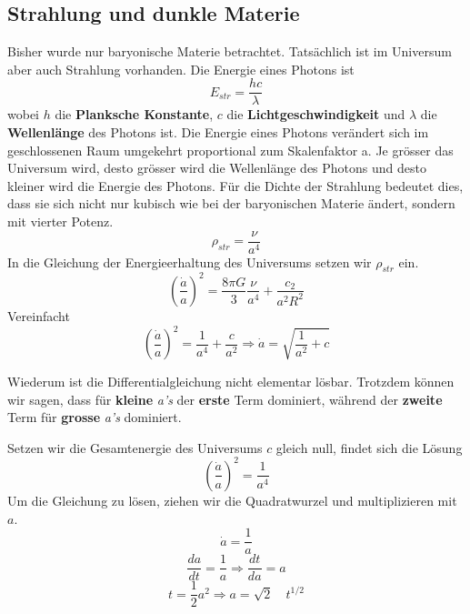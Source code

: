 \begin{refsection}
\subsection{Strahlung und dunkle Materie}
Bisher wurde nur baryonische Materie betrachtet. Tatsächlich ist im Universum aber auch Strahlung vorhanden. Die Energie eines Photons ist 
\begin{equation}
E_{str} = \frac{h c}{\lambda}
\end{equation}
wobei $h$ die \textbf{Planksche Konstante}, $c$ die \textbf{Lichtgeschwindigkeit} und $\lambda$ die \textbf{Wellenlänge} des Photons ist.
Die Energie eines Photons verändert sich im geschlossenen Raum umgekehrt proportional zum Skalenfaktor a. Je grösser das Universum wird, desto grösser wird die Wellenlänge des Photons und desto kleiner wird die Energie des Photons. Für die Dichte der Strahlung bedeutet dies, dass sie sich nicht nur kubisch wie bei der baryonischen Materie ändert, sondern mit vierter Potenz.
\begin{equation}
\rho_{str} = \frac{\nu}{a^4}
\end{equation}
In die Gleichung der Energieerhaltung des Universums setzen wir $\rho_{str}$ ein.
\[
\left(\frac{\dot{a}}{a} \right)^2 = \frac{8 \pi G}{3} \frac{\nu}{a^4} + \frac{c_2}{a^2 R^2}
\]
Vereinfacht
\[
\left(\frac{\dot{a}}{a} \right)^2 = \frac{1}{a^4} + \frac{c}{a^2} \Rightarrow \dot{a} = \sqrt{\frac{1}{a^2} + c}
\]

Wiederum ist die Differentialgleichung nicht elementar lösbar. Trotzdem können wir sagen, dass für \textbf{kleine} \textit{a's} der \textbf{erste} Term dominiert, während der \textbf{zweite} Term für \textbf{grosse} \textit{a's} dominiert.

Setzen wir die Gesamtenergie des Universums $c$ gleich null, findet sich die Lösung	\[\left(\frac{\dot{a}}{a} \right)^2 = \frac{1}{a^4}\]
Um die Gleichung zu lösen, ziehen wir die Quadratwurzel und multiplizieren mit $a$.
\[ \dot{a} = \frac{1}{a} \]
\[\frac{da}{dt} =\frac{1}{a} \Rightarrow \frac{dt}{da} = a \]
\[ t = \frac{1}{2} a^{2} \Rightarrow a = \sqrt{2} \quad t^{1/2} \]

\end{refsection}
